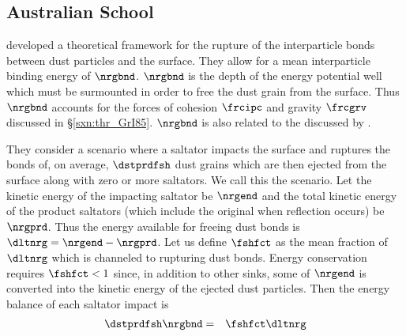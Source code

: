\documentclass[12pt,twoside]{book}
\begin{document}
\subsection[Australian School]{Australian School}\label{sxn:vrt_SRF93}
\cite{SRF93} developed a theoretical framework for the rupture of
the interparticle bonds between dust particles and the surface.
They allow for a mean interparticle binding energy of $\nrgbnd$.
$\nrgbnd$ is the depth of the energy potential well which must be
surmounted in order to free the dust grain from the surface.
Thus $\nrgbnd$ accounts for the forces of cohesion $\frcipc$ and
gravity $\frcgrv$ discussed in \S\ref{sxn:thr_GrI85}.
$\nrgbnd$ is also related to the 
discussed by \cite{GiP88}.

They consider a scenario where a saltator impacts the surface and
ruptures the bonds of, on average, $\dstprdfsh$ dust grains which are
then ejected from the surface along with zero or more saltators.
We call this the  scenario. 
Let the kinetic energy of the impacting saltator be $\nrgend$ and the 
total kinetic energy of the product saltators (which include the
original when reflection occurs) be $\nrgprd$.
Thus the energy available for freeing dust bonds is 
$\dltnrg = \nrgend - \nrgprd$.
Let us define $\fshfct$ as the mean fraction of $\dltnrg$ which is
channeled to rupturing dust bonds.
Energy conservation requires $\fshfct < 1$ since, in addition to other
sinks, some of $\nrgend$ is converted into the kinetic energy of the
ejected dust particles.   
Then the energy balance of each saltator impact is
\begin{eqnarray}
\dstprdfsh \nrgbnd & = & \fshfct \dltnrg
\label{eqn:dst_nbr_dfn}
\end{eqnarray}
\end{document}
